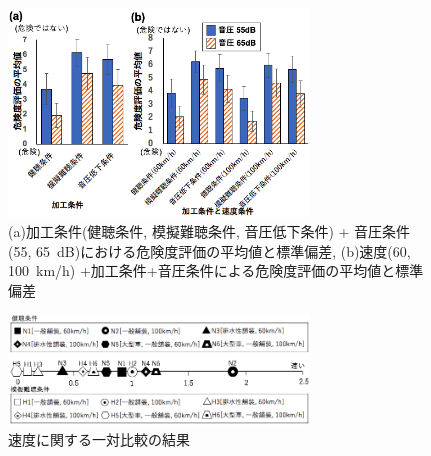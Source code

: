 \documentclass[10pt,twocolumn,uplatex,dvipdfmx]{jsarticle} %
\begin{document}

\begin{figure}[H]
  \begin{center}
      \includegraphics[width=8cm]{image/danger_result.png}
      \caption{(a)加工条件(健聴条件, 模擬難聴条件, 音圧低下条件) + 音圧条件(55, 65~dB)における危険度評価の平均値と標準偏差, (b)速度(60, 100~km/h) +加工条件+音圧条件による危険度評価の平均値と標準偏差}
      \label{fig:danger_result}
  \end{center}
\end{figure}

\vspace{-3truemm}

\begin{figure}[H]
  \begin{center}
      \includegraphics[width=8cm]{image/speed_result.png}
      \caption{速度に関する一対比較の結果}
      \label{fig:speed_result}
  \end{center}
\end{figure}
\end{document}
